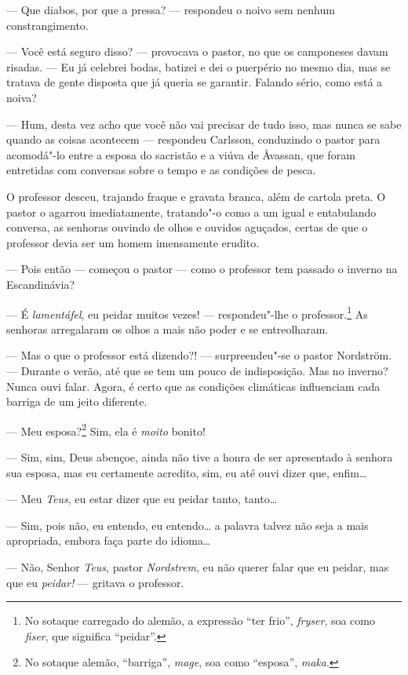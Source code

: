--- Que diabos, por que a pressa? --- respondeu o noivo sem nenhum
constrangimento.

--- Você está seguro disso? --- provocava o pastor, no que os camponeses davam
risadas. --- Eu já celebrei bodas, batizei e dei o puerpério no mesmo dia, mas
se tratava de gente disposta que já queria se garantir. Falando sério, como está
a noiva?

--- Hum, desta vez acho que você não vai precisar de tudo isso, mas nunca se sabe
quando as coisas acontecem --- respondeu Carlsson, conduzindo o pastor
para acomodá"-lo entre a esposa do sacristão e a viúva de Åvassan, que 
foram entretidas com conversas sobre o tempo e as condições de pesca.

O professor desceu, trajando fraque e gravata branca, além de cartola preta. O
pastor o agarrou imediatamente, tratando"-o como a um igual e entabulando
conversa, as senhoras ouvindo de olhos e ouvidos aguçados, certas de que o
professor devia ser um homem imensamente erudito.

--- Pois então --- começou o pastor --- como o professor tem passado o inverno na
Escandinávia?

--- É \textit{lamentáfel}, eu peidar muitos vezes! --- respondeu"-lhe o
professor.\footnote{ No sotaque carregado do alemão, a expressão “ter frio”,
\textit{fryser}, soa como \textit{fiser}, que significa “peidar”.} 
As senhoras arregalaram os olhos a mais não poder e se entreolharam.

--- Mas o que o professor está dizendo?! --- surpreendeu"-se o pastor Nordström.
--- Durante o verão, até que se tem um pouco de indisposição. Mas no inverno? Nunca
ouvi falar. Agora, é certo que as condições climáticas influenciam cada
barriga de um jeito diferente.

--- Meu esposa?\footnote{ No sotaque alemão, “barriga”, 
\textit{mage}, soa como ``esposa'', \textit{maka}.} Sim, ela é \textit{moito} bonito! 

--- Sim, sim, Deus abençoe, ainda não tive a honra de ser apresentado à senhora sua
esposa, mas eu certamente acredito, sim, eu até ouvi dizer que, enfim\ldots{}

--- Meu \textit{Teus}, eu estar dizer que eu peidar tanto, tanto\ldots{}

--- Sim, pois não, eu entendo, eu entendo\ldots{} a palavra talvez não seja a mais
apropriada, embora faça parte do idioma\ldots{}

--- Não, Senhor \textit{Teus}, pastor \textit{Nordstrem}, eu não querer falar que eu peidar, mas que
eu \textit{peidar!} --- gritava o professor.

